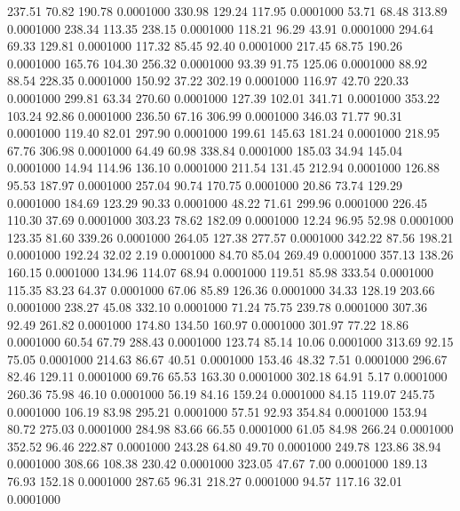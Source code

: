  237.51   70.82  190.78   0.0001000
 330.98  129.24  117.95   0.0001000
  53.71   68.48  313.89   0.0001000
 238.34  113.35  238.15   0.0001000
 118.21   96.29   43.91   0.0001000
 294.64   69.33  129.81   0.0001000
 117.32   85.45   92.40   0.0001000
 217.45   68.75  190.26   0.0001000
 165.76  104.30  256.32   0.0001000
  93.39   91.75  125.06   0.0001000
  88.92   88.54  228.35   0.0001000
 150.92   37.22  302.19   0.0001000
 116.97   42.70  220.33   0.0001000
 299.81   63.34  270.60   0.0001000
 127.39  102.01  341.71   0.0001000
 353.22  103.24   92.86   0.0001000
 236.50   67.16  306.99   0.0001000
 346.03   71.77   90.31   0.0001000
 119.40   82.01  297.90   0.0001000
 199.61  145.63  181.24   0.0001000
 218.95   67.76  306.98   0.0001000
  64.49   60.98  338.84   0.0001000
 185.03   34.94  145.04   0.0001000
  14.94  114.96  136.10   0.0001000
 211.54  131.45  212.94   0.0001000
 126.88   95.53  187.97   0.0001000
 257.04   90.74  170.75   0.0001000
  20.86   73.74  129.29   0.0001000
 184.69  123.29   90.33   0.0001000
  48.22   71.61  299.96   0.0001000
 226.45  110.30   37.69   0.0001000
 303.23   78.62  182.09   0.0001000
  12.24   96.95   52.98   0.0001000
 123.35   81.60  339.26   0.0001000
 264.05  127.38  277.57   0.0001000
 342.22   87.56  198.21   0.0001000
 192.24   32.02    2.19   0.0001000
  84.70   85.04  269.49   0.0001000
 357.13  138.26  160.15   0.0001000
 134.96  114.07   68.94   0.0001000
 119.51   85.98  333.54   0.0001000
 115.35   83.23   64.37   0.0001000
  67.06   85.89  126.36   0.0001000
  34.33  128.19  203.66   0.0001000
 238.27   45.08  332.10   0.0001000
  71.24   75.75  239.78   0.0001000
 307.36   92.49  261.82   0.0001000
 174.80  134.50  160.97   0.0001000
 301.97   77.22   18.86   0.0001000
  60.54   67.79  288.43   0.0001000
 123.74   85.14   10.06   0.0001000
 313.69   92.15   75.05   0.0001000
 214.63   86.67   40.51   0.0001000
 153.46   48.32    7.51   0.0001000
 296.67   82.46  129.11   0.0001000
  69.76   65.53  163.30   0.0001000
 302.18   64.91    5.17   0.0001000
 260.36   75.98   46.10   0.0001000
  56.19   84.16  159.24   0.0001000
  84.15  119.07  245.75   0.0001000
 106.19   83.98  295.21   0.0001000
  57.51   92.93  354.84   0.0001000
 153.94   80.72  275.03   0.0001000
 284.98   83.66   66.55   0.0001000
  61.05   84.98  266.24   0.0001000
 352.52   96.46  222.87   0.0001000
 243.28   64.80   49.70   0.0001000
 249.78  123.86   38.94   0.0001000
 308.66  108.38  230.42   0.0001000
 323.05   47.67    7.00   0.0001000
 189.13   76.93  152.18   0.0001000
 287.65   96.31  218.27   0.0001000
  94.57  117.16   32.01   0.0001000
